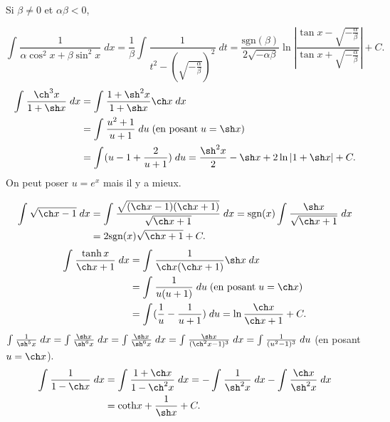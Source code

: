 {{Si $\beta\neq0$ et $\alpha\beta<0$, 

$$\int_{}^{}\frac{1}{\alpha\cos^2x+\beta\sin^2 x}\;dx=\frac{1}{\beta}\int_{}^{}\frac{1}{t^2-(\sqrt{-\frac{\alpha}{\beta}})^2}\;dt=\frac{\mbox{sgn}(\beta)}
{2\sqrt{-\alpha\beta}}\ln\left|\frac{\tan x-\sqrt{-\frac{\alpha}{\beta}}}{\tan x+\sqrt{-\frac{\alpha}{\beta}}}\right|+C.$$
\begin{align*}\ensuremath
\int_{}^{}\frac{\ch^3x}{1+\sh x}\;dx&=\int_{}^{}\frac{1+\sh^2x}{1+\sh x}\ch x\;dx\\
 &=\int_{}^{}\frac{u^2+1}{u+1}\;du\;(\mbox{en posant}\;u=\sh x)\\
 &=\int_{}^{}(u-1+\frac{2}{u+1})\;du=\frac{\sh^2x}{2}-\sh x+2\ln|1+\sh x|+C.
\end{align*}
On peut poser $u=e^x$ mais il y a mieux.

\begin{align*}\ensuremath
\int_{}^{}\sqrt{\ch x-1}\;dx&=\int_{}^{}\frac{\sqrt{(\ch x-1)(\ch x+1)}}{\sqrt{\ch x+1}}\;dx=\mbox{sgn}(x)\int_{}^{}\frac{\sh x}{\sqrt{\ch x+1}}\;dx\\
 &=2\mbox{sgn}(x)\sqrt{\ch x+1}+C.
\end{align*}
\begin{align*}\ensuremath
\int_{}^{}\frac{\tanh x}{\ch x+1}\;dx&=\int_{}^{}\frac{1}{\ch x(\ch x+1)}\sh x\;dx\\
 &=\int_{}^{}\frac{1}{u(u+1)}\;du\;(\mbox{en posant}\;u=\ch x)\\
 &=\int_{}^{}(\frac{1}{u}-\frac{1}{u+1})\;du=\ln\frac{\ch x}{\ch x+1}+C.
\end{align*}
$\int_{}^{}\frac{1}{\sh^5x}\;dx=\int_{}^{}\frac{\sh x}{\sh^6x}\;dx
=\int_{}^{}\frac{\sh x}{\sh^6x}\;dx=\int_{}^{}\frac{\sh x}{(\ch^2x-1)^3}\;dx=\int_{}^{}\frac{1}{(u^2-1)^3}\;du$ (en posant $u=\ch x$).
\begin{align*}\ensuremath
\int_{}^{}\frac{1}{1-\ch x}\;dx&=\int_{}^{}\frac{1+\ch x}{1-\ch^2x}\;dx=-\int_{}^{}\frac{1}{\sh^2x}\;dx-\int_{}^{}\frac{\ch x}{\sh^2x}\;dx\\
 &=\mbox{coth}x+\frac{1}{\sh x}+C.
\end{align*}
}
}

